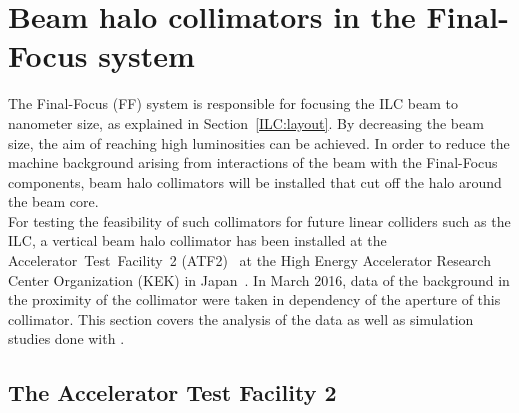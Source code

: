 \section{Beam halo collimators in the Final-Focus system}

The Final-Focus (FF) system is responsible for focusing the ILC beam to nanometer size, as explained in Section~\ref{ILC:layout}. 
By decreasing the beam size, the aim of reaching high luminosities can be achieved.
In order to reduce the machine background arising from interactions of the beam with the Final-Focus components, beam halo collimators will be installed that cut off the halo around the beam core. 
\\For testing the feasibility of such collimators for future linear colliders such as the ILC, a vertical beam halo collimator has been installed at the \mbox{Accelerator Test Facility 2} (ATF2)~\cite{ATF} at the High Energy Accelerator Research Center Organization (KEK) in Japan~\cite{Nuria_Thesis}. 
In March 2016, data of the background in the proximity of the collimator were taken in dependency of the aperture of this collimator. 
This section covers the analysis of the data as well as simulation studies done with \bdsim.

\subsection{The Accelerator Test Facility 2}
\label{ATF2}


